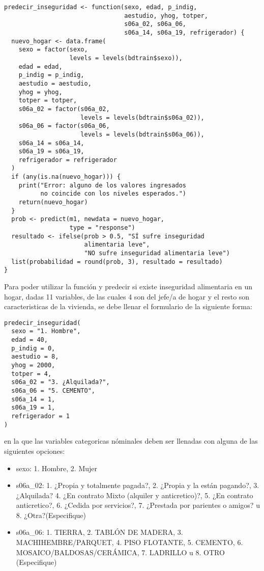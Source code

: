 \documentclass[Royal,times,sageh]{sagej}
\providecommand{\tightlist}{%
  \setlength{\itemsep}{0pt}\setlength{\parskip}{0pt}}
\begin{document}
\begin{verbatim}
predecir_inseguridad <- function(sexo, edad, p_indig, 
                                 aestudio, yhog, totper,
                                 s06a_02, s06a_06, 
                                 s06a_14, s06a_19, refrigerador) {
  nuevo_hogar <- data.frame(
    sexo = factor(sexo, 
                  levels = levels(bdtrain$sexo)),
    edad = edad,
    p_indig = p_indig,
    aestudio = aestudio,
    yhog = yhog,
    totper = totper,
    s06a_02 = factor(s06a_02, 
                     levels = levels(bdtrain$s06a_02)),
    s06a_06 = factor(s06a_06, 
                     levels = levels(bdtrain$s06a_06)),
    s06a_14 = s06a_14,
    s06a_19 = s06a_19,
    refrigerador = refrigerador
  )
  if (any(is.na(nuevo_hogar))) {
    print("Error: alguno de los valores ingresados 
          no coincide con los niveles esperados.")
    return(nuevo_hogar)
  }
  prob <- predict(m1, newdata = nuevo_hogar, 
                  type = "response")
  resultado <- ifelse(prob > 0.5, "SÍ sufre inseguridad 
                      alimentaria leve", 
                      "NO sufre inseguridad alimentaria leve")
  list(probabilidad = round(prob, 3), resultado = resultado)
}
\end{verbatim}

Para poder utilizar la función y predecir si existe inseguridad
alimentaria en un hogar, dadas 11 variables, de las cuales 4 son del
jefe/a de hogar y el resto son caracteristicas de la vivienda, se debe
llenar el formulario de la siguiente forma:

\begin{verbatim}
predecir_inseguridad(
  sexo = "1. Hombre",
  edad = 40,
  p_indig = 0,
  aestudio = 8,
  yhog = 2000,
  totper = 4,
  s06a_02 = "3. ¿Alquilada?",
  s06a_06 = "5. CEMENTO",
  s06a_14 = 1,
  s06a_19 = 1,
  refrigerador = 1
)
\end{verbatim}

en la que las variables categoricas nóminales deben ser llenadas con
alguna de las siguientes opciones:

\begin{itemize}
\tightlist
\item
  sexo: 1. Hombre, 2. Mujer
\item
  s06a\_02: 1. ¿Propia y totalmente pagada?, 2. ¿Propia y la están
  pagando?, 3. ¿Alquilada? 4. ¿En contrato Mixto (alquiler y
  anticretico)?, 5. ¿En contrato anticretico?, 6. ¿Cedida por
  servicios?, 7. ¿Prestada por parientes o amigos? u 8.
  ¿Otra?(Especifique)
\item
  s06a\_06: 1. TIERRA, 2. TABLÓN DE MADERA, 3. MACHIHEMBRE/PARQUET, 4.
  PISO FLOTANTE, 5. CEMENTO, 6. MOSAICO/BALDOSAS/CERÁMICA, 7. LADRILLO u
  8. OTRO (Especifique)
\end{itemize}
\end{document}
